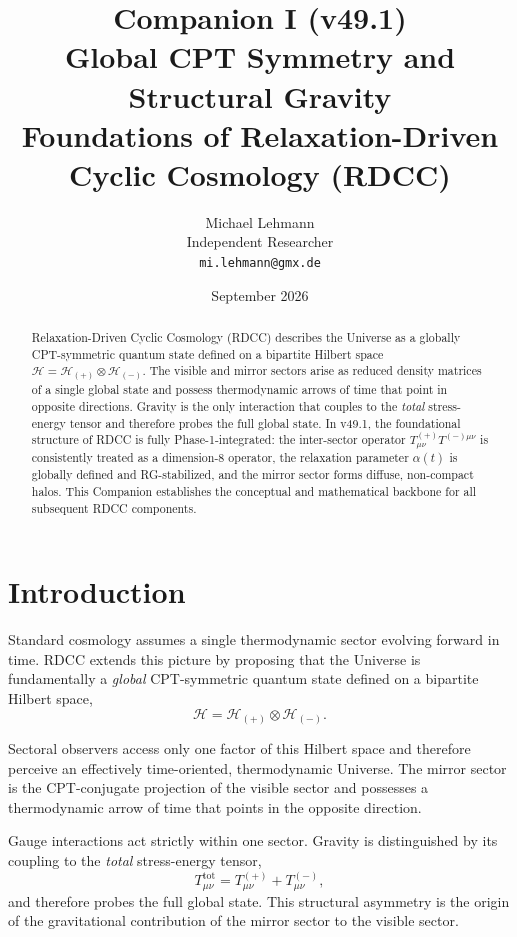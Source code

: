 \documentclass[11pt,a4paper]{article}
\title{\textbf{Companion I (v49.1)}\\[0.2cm]
\textbf{Global CPT Symmetry and Structural Gravity}\\[0.3cm]
\large Foundations of Relaxation-Driven Cyclic Cosmology (RDCC)}
\author{Michael Lehmann\\
Independent Researcher\\
\texttt{mi.lehmann@gmx.de}}
\date{September 2026}
\begin{document}
\maketitle

\begin{abstract}
Relaxation-Driven Cyclic Cosmology (RDCC) describes the Universe as a globally
CPT-symmetric quantum state defined on a bipartite Hilbert space
$\mathcal{H} = \mathcal{H}_{(+)} \otimes \mathcal{H}_{(-)}$. The visible and
mirror sectors arise as reduced density matrices of a single global state and
possess thermodynamic arrows of time that point in opposite directions. Gravity
is the only interaction that couples to the \emph{total} stress-energy tensor
and therefore probes the full global state. In v49.1, the foundational
structure of RDCC is fully Phase-1-integrated: the inter-sector operator
$T^{(+)}_{\mu\nu}T^{(-)\mu\nu}$ is consistently treated as a dimension-8
operator, the relaxation parameter $\alpha(t)$ is globally defined and
RG-stabilized, and the mirror sector forms diffuse, non-compact halos. This
Companion establishes the conceptual and mathematical backbone for all
subsequent RDCC components.
\end{abstract}

\tableofcontents
\newpage
\section{Introduction}

Standard cosmology assumes a single thermodynamic sector evolving forward in
time. RDCC extends this picture by proposing that the Universe is fundamentally
a \emph{global} CPT-symmetric quantum state defined on a bipartite Hilbert
space,
\begin{equation}
\mathcal{H} = \mathcal{H}_{(+)} \otimes \mathcal{H}_{(-)}.
\end{equation}

Sectoral observers access only one factor of this Hilbert space and therefore
perceive an effectively time-oriented, thermodynamic Universe. The mirror
sector is the CPT-conjugate projection of the visible sector and possesses a
thermodynamic arrow of time that points in the opposite direction.

Gauge interactions act strictly within one sector. Gravity is distinguished by
its coupling to the \emph{total} stress-energy tensor,
\begin{equation}
T^{\mathrm{tot}}_{\mu\nu}
=
T^{(+)}_{\mu\nu}
+
T^{(-)}_{\mu\nu},
\end{equation}
and therefore probes the full global state. This structural asymmetry is the
origin of the gravitational contribution of the mirror sector to the visible
sector.
\end{document}
